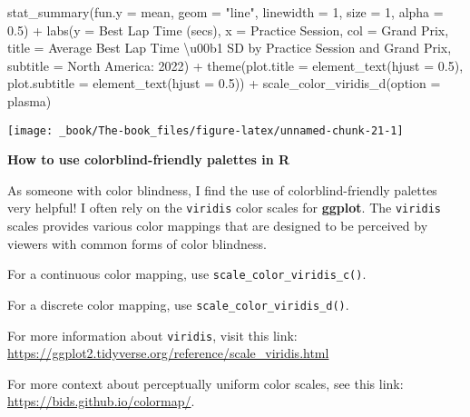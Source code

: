 \documentclass[
]{book}
\newenvironment{Shaded}{\begin{snugshade}}{\end{snugshade}}
\newcommand{\AttributeTok}[1]{\textcolor[rgb]{0.77,0.63,0.00}{#1}}
\newcommand{\DecValTok}[1]{\textcolor[rgb]{0.00,0.00,0.81}{#1}}
\newcommand{\FloatTok}[1]{\textcolor[rgb]{0.00,0.00,0.81}{#1}}
\newcommand{\FunctionTok}[1]{\textcolor[rgb]{0.00,0.00,0.00}{#1}}
\newcommand{\NormalTok}[1]{#1}
\newcommand{\SpecialCharTok}[1]{\textcolor[rgb]{0.00,0.00,0.00}{#1}}
\newcommand{\StringTok}[1]{\textcolor[rgb]{0.31,0.60,0.02}{#1}}
\begin{document}
\begin{Shaded}
\begin{Highlighting}[]
  \FunctionTok{stat\_summary}\NormalTok{(}\AttributeTok{fun.y =}\NormalTok{ mean,}
               \AttributeTok{geom =} \StringTok{"line"}\NormalTok{, }
               \AttributeTok{linewidth =} \DecValTok{1}\NormalTok{, }\AttributeTok{size =} \DecValTok{1}\NormalTok{, }\AttributeTok{alpha =} \FloatTok{0.5}\NormalTok{) }\SpecialCharTok{+}
  \FunctionTok{labs}\NormalTok{(}\AttributeTok{y =} \StringTok{\textquotesingle{}Best Lap Time (secs)\textquotesingle{}}\NormalTok{,}
       \AttributeTok{x =} \StringTok{\textquotesingle{}Practice Session\textquotesingle{}}\NormalTok{,}
       \AttributeTok{col =} \StringTok{\textquotesingle{}Grand Prix\textquotesingle{}}\NormalTok{,}
       \AttributeTok{title =} \StringTok{\textquotesingle{}Average Best Lap Time \textbackslash{}u00b1 SD by Practice Session and Grand Prix\textquotesingle{}}\NormalTok{,}
       \AttributeTok{subtitle =} \StringTok{\textquotesingle{}North America: 2022\textquotesingle{}}\NormalTok{) }\SpecialCharTok{+}
  \FunctionTok{theme}\NormalTok{(}\AttributeTok{plot.title =} \FunctionTok{element\_text}\NormalTok{(}\AttributeTok{hjust =} \FloatTok{0.5}\NormalTok{),}
        \AttributeTok{plot.subtitle =} \FunctionTok{element\_text}\NormalTok{(}\AttributeTok{hjust =} \FloatTok{0.5}\NormalTok{)) }\SpecialCharTok{+}
  \FunctionTok{scale\_color\_viridis\_d}\NormalTok{(}\AttributeTok{option =} \StringTok{\textquotesingle{}plasma\textquotesingle{}}\NormalTok{)}
\end{Highlighting}
\end{Shaded}

\begin{center}\texttt{[image: \_book/The-book\_files/figure-latex/unnamed-chunk-21-1]} \end{center}

\begin{blackbox}

\begin{center}
\textbf{How to use colorblind-friendly palettes in R}

\end{center}

As someone with color blindness, I find the use of colorblind-friendly palettes very helpful! I often rely on the \texttt{viridis} color scales for \textbf{ggplot}. The \texttt{viridis} scales provides various color mappings that are designed to be perceived by viewers with common forms of color blindness.

For a continuous color mapping, use \texttt{scale\_color\_viridis\_c()}.

For a discrete color mapping, use \texttt{scale\_color\_viridis\_d()}.

For more information about \texttt{viridis}, visit this link: \url{https://ggplot2.tidyverse.org/reference/scale_viridis.html}

For more context about perceptually uniform color scales, see this link:
\url{https://bids.github.io/colormap/}.

\end{blackbox}
\end{document}
